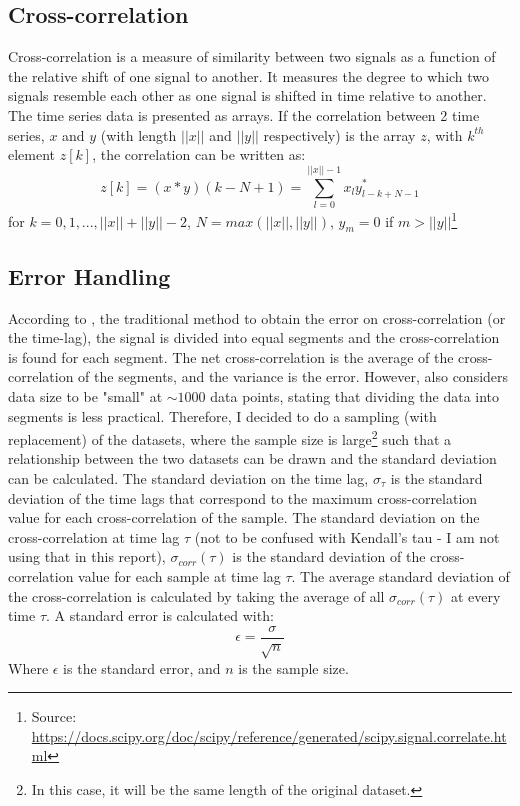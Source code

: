 \documentclass[a4paper, 10pt, conference]{ieeeconf}      %
\begin{document}
\subsection{Cross-correlation}
Cross-correlation is a measure of similarity between two signals as a function of the relative shift of one signal to another. It measures the degree to which two signals resemble each other as one signal is shifted in time relative to another. The time series data is presented as arrays. If the correlation between 2 time series, $x$ and $y$ (with length $||x||$ and $||y||$ respectively) is the array $z$, with ${k}^{th}$ element $z[{k}]$, the correlation can be written as: 
\begin{equation}
    z[{k}] = (x * y)(k - N + 1) = \sum_{l=0}^{||x||-1}x_{l}y^{*}_{l-k+N-1}
\end{equation}
for $k = 0, 1,..., ||x||+||y||-2$, $N = max(||x||, ||y||)$, $y_m = 0$ if $m > ||y||$\footnote{Source: \url{https://docs.scipy.org/doc/scipy/reference/generated/scipy.signal.correlate.html}}

\subsection{Error Handling}
According to \cite{Misra2018}, the traditional method to obtain the error on cross-correlation (or the time-lag), the signal is divided into equal segments and the cross-correlation is found for each segment. The net cross-correlation is the average of the cross-correlation of the segments, and the variance is the error. However, \cite{Misra2018} also considers data size to be "small" at $\sim1000$ data points, stating that dividing the data into segments is less practical. Therefore, I decided to do a sampling (with replacement) of the datasets, where the sample size is large\footnote{In this case, it will be the same length of the original dataset.} such that a relationship between the two datasets can be drawn \cite{Kose2023} and the standard deviation can be calculated. The standard deviation on the time lag, $\sigma_\tau$ is the standard deviation of the time lags that correspond to the maximum cross-correlation value for each cross-correlation of the sample. The standard deviation on the cross-correlation at time lag $\tau$ (not to be confused with Kendall's tau - I am not using that in this report), $\sigma_{corr}(\tau)$ is the standard deviation of the cross-correlation value for each sample at time lag $\tau$. The average standard deviation of the cross-correlation is calculated by taking the average of all $\sigma_{corr}(\tau)$ at every time $\tau$. A standard error is calculated with:
\begin{equation}
    \epsilon = \frac{\sigma}{\sqrt{n}}
\end{equation}
Where $\epsilon$ is the standard error, and $n$ is the sample size.
\end{document}
